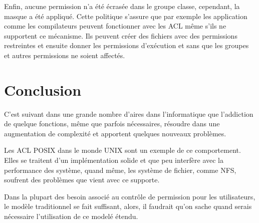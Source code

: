 \documentclass{article}
\begin{document}
Enfin, aucune permission n'a été écrasée dans le groupe classe, cependant, la masque a été appliqué. Cette politique s'assure que par exemple les application comme les compilateurs peuvent fonctionner avec les ACL même s'ils ne supportent ce mécanisme. Ils peuvent créer des fichiers avec des permissions restreintes et ensuite donner les permissions d'exécution et sans que les groupes et autres permissions ne soient affectés.

\section{Conclusion}
C'est suivant dans une grande nombre d'aires dans l'informatique que l'addiction de quelque fonctions, même que parfois nécessaires, résoudre dans une augmentation de complexité et apportent quelques nouveaux problèmes. 

Les ACL POSIX dans le monde UNIX sont un exemple de ce comportement. Elles se traitent d'un implémentation solide et que peu interfère avec la performance des système, quand même, les système de fichier, comme NFS, soufrent des problèmes que vient avec ce supporte.

Dans la plupart des besoin associé au contrôle de permission pour les utilisateurs, le modèle traditionnel se fait suffisant, alors, il faudrait qu'on sache quand serais nécessaire l'utilisation de ce modelé étendu. 

\newpage
\end{document}
